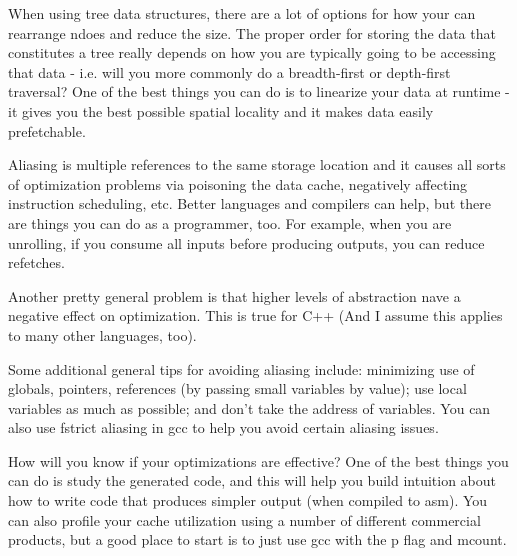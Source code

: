 \documentclass[letterpaper,12pt,titlepage]{article}
\begin{document}
When using tree data structures, there are a lot of options for how your can rearrange ndoes and reduce the size. The proper order for storing the data that constitutes a tree really depends on how you are typically going to be accessing that data - i.e. will you more commonly do a breadth-first or depth-first traversal? One of the best things you can do is to linearize your data at runtime - it gives you the best possible spatial locality and it makes data easily prefetchable.

Aliasing is multiple references to the same storage location and it causes all sorts of optimization problems via poisoning the data cache, negatively affecting instruction scheduling, etc. Better languages and compilers can help, but there are things you can do as a programmer, too. For example, when you are unrolling, if you consume all inputs before producing outputs, you can reduce refetches.

Another pretty general problem is that higher levels of abstraction nave a negative effect on optimization. This is true for C++ (And I assume this applies to many other languages, too).

Some additional general tips for avoiding aliasing include: minimizing use of globals, pointers, references (by passing small variables by value); use local variables as much as possible; and don't take the address of variables. You can also use fstrict aliasing in gcc to help you avoid certain aliasing issues.

How will you know if your optimizations are effective? One of the best things you can do is study the generated code, and this will help you build intuition about how to write code that produces simpler output (when compiled to asm). You can also profile your cache utilization using a number of different commercial products, but a good place to start is to just use gcc with the p flag and mcount.

\nocite {Ericson}


\end{document}
